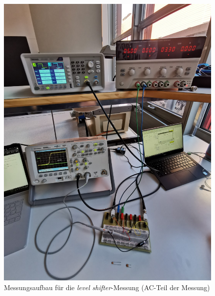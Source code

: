 \documentclass[../main.tex]{subfiles}
\begin{document}
\begin{figure}[h]
    \centering
    \includegraphics[scale=0.075]{assets/task3_square/task3_1.jpg}
    \caption{Messungsaufbau für die \textit{level shifter}-Messung (AC-Teil der Messung)}
    \label{fig:setup_task3_1}
\end{figure}
\end{document}
